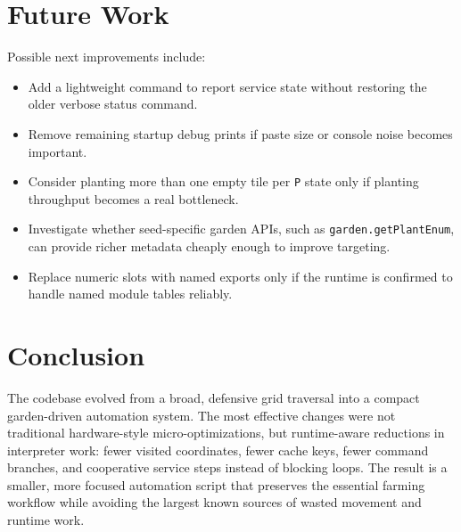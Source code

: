\documentclass[11pt]{article}
\begin{document}
\section{Future Work}

Possible next improvements include:

\begin{itemize}
    \item Add a lightweight command to report service state without restoring the older verbose status command.
    \item Remove remaining startup debug prints if paste size or console noise becomes important.
    \item Consider planting more than one empty tile per \texttt{P} state only if planting throughput becomes a real bottleneck.
    \item Investigate whether seed-specific garden APIs, such as \texttt{garden.getPlantEnum}, can provide richer metadata cheaply enough to improve targeting.
    \item Replace numeric slots with named exports only if the runtime is confirmed to handle named module tables reliably.
\end{itemize}

\section{Conclusion}

The codebase evolved from a broad, defensive grid traversal into a compact
garden-driven automation system. The most effective changes were not traditional
hardware-style micro-optimizations, but runtime-aware reductions in interpreter
work: fewer visited coordinates, fewer cache keys, fewer command branches, and
cooperative service steps instead of blocking loops. The result is a smaller,
more focused automation script that preserves the essential farming workflow
while avoiding the largest known sources of wasted movement and runtime work.
\end{document}
